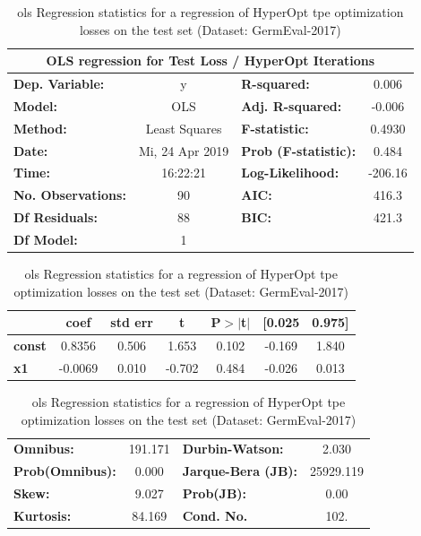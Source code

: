 \begin{table}
	\begin{center}
		\begin{tabular}{lclc}
		\toprule
		\multicolumn{4}{c}{OLS regression for Test Loss / HyperOpt Iterations} \\
		\midrule
		\textbf{Dep. Variable:}    &        y        & \textbf{  R-squared:         } &     0.006   \\
		\textbf{Model:}            &       OLS       & \textbf{  Adj. R-squared:    } &    -0.006   \\
		\textbf{Method:}           &  Least Squares  & \textbf{  F-statistic:       } &    0.4930   \\
		\textbf{Date:}             & Mi, 24 Apr 2019 & \textbf{  Prob (F-statistic):} &    0.484    \\
		\textbf{Time:}             &     16:22:21    & \textbf{  Log-Likelihood:    } &   -206.16   \\
		\textbf{No. Observations:} &          90     & \textbf{  AIC:               } &     416.3   \\
		\textbf{Df Residuals:}     &          88     & \textbf{  BIC:               } &     421.3   \\
		\textbf{Df Model:}         &           1     & \textbf{                     } &             \\
		\bottomrule
		\end{tabular}
		\begin{tabular}{lcccccc}
					& \textbf{coef} & \textbf{std err} & \textbf{t} & \textbf{P$>$$|$t$|$} & \textbf{[0.025} & \textbf{0.975]}  \\
		\midrule
		\textbf{const} &       0.8356  &        0.506     &     1.653  &         0.102        &       -0.169    &        1.840     \\
		\textbf{x1}    &      -0.0069  &        0.010     &    -0.702  &         0.484        &       -0.026    &        0.013     \\
		\bottomrule
		\end{tabular}
		\begin{tabular}{lclc}
		\textbf{Omnibus:}       & 191.171 & \textbf{  Durbin-Watson:     } &     2.030  \\
		\textbf{Prob(Omnibus):} &   0.000 & \textbf{  Jarque-Bera (JB):  } & 25929.119  \\
		\textbf{Skew:}          &   9.027 & \textbf{  Prob(JB):          } &      0.00  \\
		\textbf{Kurtosis:}      &  84.169 & \textbf{  Cond. No.          } &      102.  \\
		\bottomrule
		\end{tabular}
	\end{center}
	\caption{\gls{ols} Regression statistics for a regression of HyperOpt \gls{tpe} optimization losses on the test set {(Dataset: GermEval-2017)}}
	\label{tab:08_olsLossItTest}	
\end{table}

